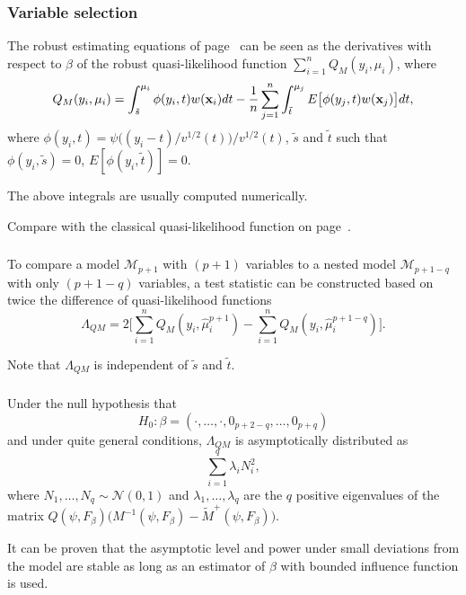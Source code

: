 \documentclass{beamer}
\newcommand{\bs}{\bigskip}
\begin{document}
\begin{frame}
\frametitle{Variable selection}
The robust estimating equations of page~\pageref{EEw.page} can be seen as the
derivatives with respect to  $\beta$ of the {\color{blue}robust
quasi-likelihood} function $\sum_{i=1}^n Q_M(y_i, \mu_i)$, where
\begin{equation*}
\label{QM.explicit}
Q_M(y_i, \mu_i) = \int_{\tilde{s}}^{\mu_i} \phi(y_i, t) w({\bf x}_i)
dt - \frac{1}{n} \sum_{j=1}^n \int_{\tilde{t}}^{\mu_j} E \big[ \phi(y_j,t) w({\bf
x}_j) \big] dt,
\end{equation*}
where $\phi(y_i,t) = \psi\big((y_i-t)/v^{1/2}(t)\big)/v^{1/2}(t)$, $\tilde{s}$
and $\tilde{t}$ such that $\phi(y_i, \tilde{s}) = 0$, $
E[\phi(y_i,\tilde{t})] = 0$.

\bs
The above integrals are usually computed numerically.

\bs
Compare with the classical quasi-likelihood function on page~\pageref{QL.page}.
\end{frame}

\begin{frame}
\frametitle{}
To compare a model ${\mathcal M}_{p+1}$ with $(p+1)$ variables to a nested
model ${\mathcal M}_{p+1-q}$ with only $(p+1-q)$ variables,
a test statistic can be constructed based on twice the {\color{blue}difference
of quasi-likelihood} functions
\begin{equation*}
\label{quasi.dev}
\Lambda_{QM} = 2 \Big[ \sum_{i=1}^n Q_M(y_i, \hat{\mu}^{p+1}_i) - \sum_{i=1}^n
Q_M(y_i, \hat{\mu}^{p+1-q}_i) \Big].
\end{equation*}

\bs
Note that $\Lambda_{QM}$ is independent of $\tilde{s}$ and $\tilde{t}$.
\end{frame}

\begin{frame}
\frametitle{}
Under the null hypothesis that
$$H_0: \beta = (\cdot, \ldots, \cdot,0_{p+2-q},\ldots,0_{p+q})$$
and under quite general conditions, $\Lambda_{QM}$ is
asymptotically distributed as
$$\sum_{i=1}^q \lambda_i N_i^2,$$
where $N_1, \ldots,N_q \sim {\mathcal N}(0,1)$ and $\lambda_1, \ldots,
\lambda_q$ are the $q$ positive eigenvalues of the
matrix $Q(\psi,F_{\beta}) \big(M^{-1}(\psi,F_{\beta}) - \tilde{M}^{+}(\psi,
F_{\beta}) \big)$.

\bs
It can be proven that the asymptotic level and power under small deviations from
the model are stable as long as an estimator of $\beta$ with bounded influence
function is used.
\end{frame}
\end{document}
